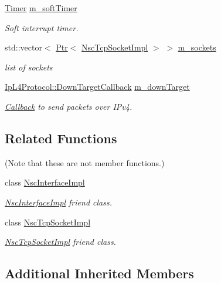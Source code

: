 \begin{DoxyCompactItemize}
\hyperlink{classns3_1_1Timer}{Timer} \hyperlink{classns3_1_1NscTcpL4Protocol_a0f73a0972ef238971e9d544e87b3510a}{m\+\_\+soft\+Timer}
\begin{DoxyCompactList}\small\item\em Soft interrupt timer. \end{DoxyCompactList}\item 
std\+::vector$<$ \hyperlink{classns3_1_1Ptr}{Ptr}$<$ \hyperlink{classns3_1_1NscTcpSocketImpl}{Nsc\+Tcp\+Socket\+Impl} $>$ $>$ \hyperlink{classns3_1_1NscTcpL4Protocol_ab8a0e5f53dffd3991f97dc7f886c0dc8}{m\+\_\+sockets}
\begin{DoxyCompactList}\small\item\em list of sockets \end{DoxyCompactList}\item 
\hyperlink{classns3_1_1IpL4Protocol_ae3ba76c0a48fbaa90529c528a15f12b6}{Ip\+L4\+Protocol\+::\+Down\+Target\+Callback} \hyperlink{classns3_1_1NscTcpL4Protocol_a83227e4d5dbb352bb29edf0ee48a026e}{m\+\_\+down\+Target}
\begin{DoxyCompactList}\small\item\em \hyperlink{classns3_1_1Callback}{Callback} to send packets over I\+Pv4. \end{DoxyCompactList}\end{DoxyCompactItemize}
\subsection*{Related Functions}
(Note that these are not member functions.) \begin{DoxyCompactItemize}
\item 
class \hyperlink{classns3_1_1NscTcpL4Protocol_a083f791782454a6f8f1d126804d70de6}{Nsc\+Interface\+Impl}
\begin{DoxyCompactList}\small\item\em \hyperlink{classns3_1_1NscInterfaceImpl}{Nsc\+Interface\+Impl} friend class. \end{DoxyCompactList}\item 
class \hyperlink{classns3_1_1NscTcpL4Protocol_ae004dd5b6155dc0a19b62d246b3b015e}{Nsc\+Tcp\+Socket\+Impl}
\begin{DoxyCompactList}\small\item\em \hyperlink{classns3_1_1NscTcpSocketImpl}{Nsc\+Tcp\+Socket\+Impl} friend class. \end{DoxyCompactList}\end{DoxyCompactItemize}
\subsection*{Additional Inherited Members}


